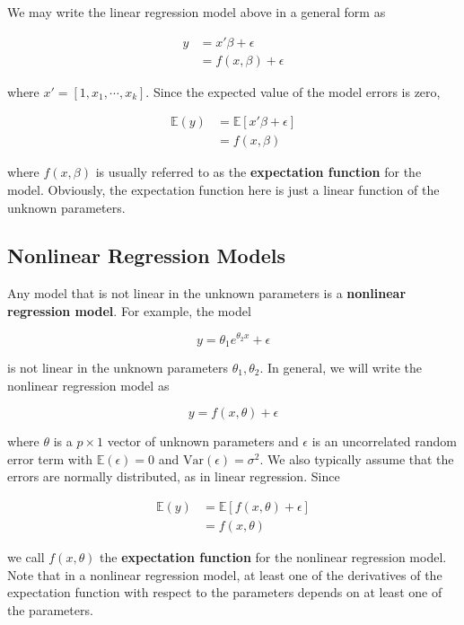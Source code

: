 \documentclass[12pt]{article}
\begin{document}
We may write the linear regression model above in a general form as

$$
\begin{aligned}
y &= x'\beta + \epsilon \\
&= f(x, \beta) + \epsilon
\end{aligned}
$$

where $x' = [1, x_1, \cdots, x_k]$. Since the expected value of the model errors is zero, 

$$
\begin{aligned}
\mathbb{E}(y) &= \mathbb{E} [x'\beta + \epsilon] \\
&= f(x, \beta)
\end{aligned}
$$

where $f(x, \beta)$ is usually referred to as the \textbf{expectation function} for the model. Obviously, the expectation function here is just a linear function of the unknown parameters. 


\subsection{Nonlinear Regression Models}

Any model that is not linear in the unknown parameters is a \textbf{nonlinear regression model}. For example, the model

$$
y = \theta_1 e^{\theta_2 x} + \epsilon
$$

is not linear in the unknown parameters $\theta_1, \theta_2$. In general, we will write the nonlinear regression model as

$$
y = f(x, \theta) + \epsilon
$$

where $\theta$ is a $p \times 1$ vector of unknown parameters and $\epsilon$ is an uncorrelated random error term with $\mathbb{E}(\epsilon) = 0$ and $\mathrm{Var}(\epsilon)=\sigma^2$. We also typically assume that the errors are normally distributed, as in linear regression. Since

$$
\begin{aligned}
\mathbb{E}(y) &= \mathbb{E} [f(x, \theta) + \epsilon] \\
&= f(x, \theta)
\end{aligned}
$$

we call $f(x, \theta)$ the \textbf{expectation function} for the nonlinear regression model. Note that in a nonlinear regression model, at least one of the derivatives of the expectation function with respect to the parameters depends on at least one of the parameters.
\end{document}
